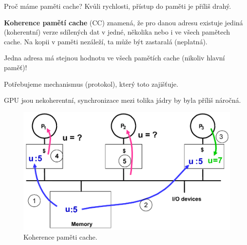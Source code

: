 \begin{compactitem}
    \item Proč máme paměti cache? Kvůli rychlosti, přístup do paměti je příliš drahý.

    \item \textbf{Koherence pamětí cache} (CC) znamená, že pro danou adresu existuje jediná (koherentní) verze sdílených dat v jedné, několika nebo i ve všech pamětech cache. Na kopii v paměti nezáleží, ta může být zastaralá (neplatná). \begin{compactitem}
        \item Jedna adresa má stejnou hodnotu ve všech pamětích cache (nikoliv hlavní paměť)!
        \item Potřebujeme mechanismus (protokol), který toto zajišťuje.
    \end{compactitem}

    \item GPU jsou nekoherentní, synchronizace mezi tolika jádry by byla příliš náročná.

    \begin{figure}[H]
        \centering
        \includegraphics[width=0.75\linewidth]{koherence.pdf}
        \caption{Koherence paměti cache.}
    \end{figure}


\end{compactitem}
